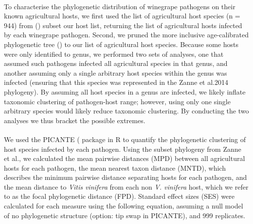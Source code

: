 \documentclass{article}
\begin{document}
\paragraph{}To characterise the phylogenetic distribution of winegrape pathogens on their known agricultural hosts, we first used the list of agricultural host species (n = 944) from (\citep{Milla2018}) subset our host list, returning the list of agricultural hosts infected by each winegrape pathogen. Second, we pruned the more inclusive age-calibrated phylogenetic tree (\citep{Zanne2014}) to our list of agricultural host species. Because some hosts were only identified to genus, we performed two sets of analyses, one that assumed such pathogens infected all agricultural species in that genus, and another assuming only a single arbitrary host species within the genus was infected (ensuring that this species was represented in the Zanne et al.2014 phylogeny\citep{Zanne2014}). By assuming all host species in a genus are infected, we likely inflate taxonomic clustering of pathogen-host range;  however, using only one single arbitrary species would likely reduce taxonomic clustering. By conducting the two analyses we thus bracket the possible extremes.

\paragraph{}We used the PICANTE (\citep{PICANTE} package in R to quantify the phylogenetic clustering of host species infected by each pathogen. Using the subset phylogeny from Zanne et al.\citep{Zanne2014}, we calculated the mean pairwise distances (MPD) between all agricultural hosts for each pathogen, the mean nearest taxon distance (MNTD), which describes the minimum pairwise distance separating hosts for each pathogen, and the mean distance to \textit{Vitis vinifera} from each non \textit{V. vinifera} host, which we refer to as the focal phylogenetic distance (FPD). Standard effect sizes (SES) were calculated for each measure using the following equation, assuming a null model of no phylogenetic structure (option: tip swap in PICANTE), and 999 replicates.
\end{document}
